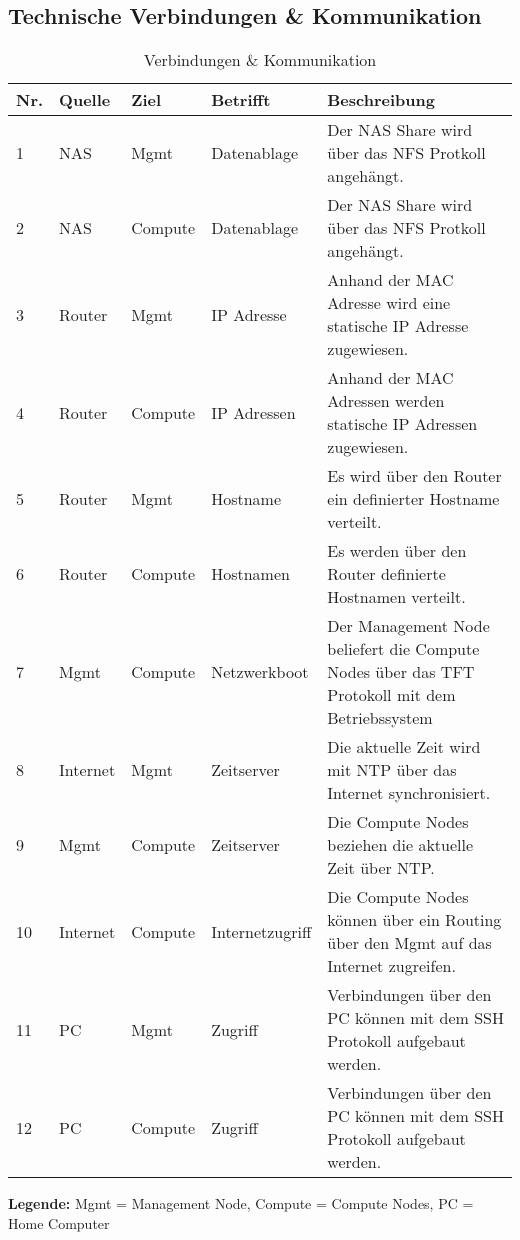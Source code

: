 \subsection{Technische Verbindungen \& Kommunikation}
\begin{table}[H]
\centering
\begin{tabular}{p{1cm}p{1.5cm}p{1.5cm}p{2.2cm}p{8.8cm}}
\hline
\rowcolor{heading} \textbf{Nr.} & \textbf{Quelle} & \textbf{Ziel }& \textbf{Betrifft} & \textbf{Beschreibung} \\\hline
1 & NAS & Mgmt & Datenablage & Der NAS Share wird über das NFS Protkoll angehängt. \\\hline
2 & NAS & Compute & Datenablage & Der NAS Share wird über das NFS Protkoll angehängt. \\\hline
3 & Router & Mgmt & IP Adresse & Anhand der MAC Adresse wird eine statische IP Adresse zugewiesen. \\\hline
4 & Router & Compute & IP Adressen & Anhand der MAC Adressen werden statische IP Adressen zugewiesen. \\\hline
5 & Router & Mgmt &Hostname & Es wird über den Router ein definierter Hostname verteilt. \\\hline
6 & Router & Compute & Hostnamen & Es werden über den Router definierte Hostnamen verteilt. \\\hline
7 & Mgmt & Compute & Netzwerkboot & Der Management Node beliefert die Compute Nodes über das TFT Protokoll mit dem Betriebssystem \\\hline
8 & Internet & Mgmt & Zeitserver & Die aktuelle Zeit wird mit NTP über das Internet synchronisiert.\\\hline
9 & Mgmt & Compute & Zeitserver & Die Compute Nodes beziehen die aktuelle Zeit über NTP.\\\hline
10 & Internet & Compute & Internetzugriff & Die Compute Nodes können über ein Routing über den Mgmt auf das Internet zugreifen. \\\hline
11 & PC & Mgmt & Zugriff & Verbindungen über den PC können mit dem SSH Protokoll aufgebaut werden. \\\hline
12 & PC & Compute & Zugriff & Verbindungen über den PC können mit dem SSH Protokoll aufgebaut werden. \\\hline
\end{tabular}
\caption{Verbindungen \& Kommunikation}
\end{table}
\textbf{Legende:} Mgmt = Management Node, Compute = Compute Nodes, PC = Home Computer
